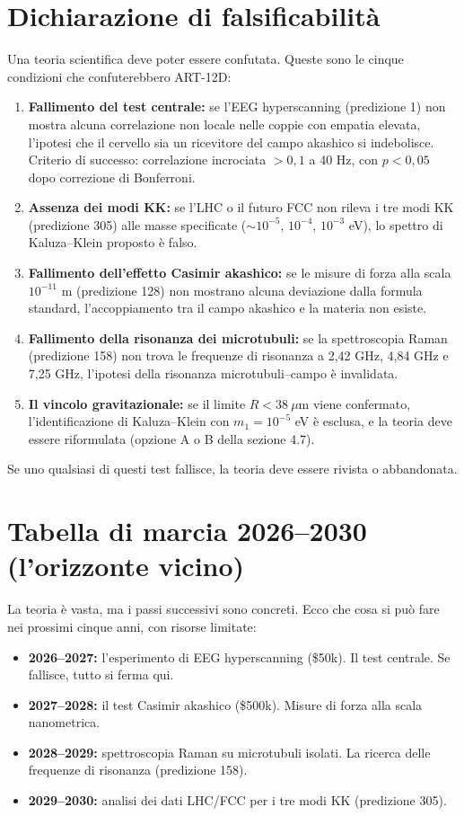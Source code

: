 \section{Dichiarazione di falsificabilità}
Una teoria scientifica deve poter essere confutata. Queste sono le cinque condizioni che confuterebbero ART-12D:
\begin{enumerate}
    \item \textbf{Fallimento del test centrale:} se l'EEG hyperscanning (predizione 1) non mostra alcuna correlazione non locale nelle coppie con empatia elevata, l'ipotesi che il cervello sia un ricevitore del campo akashico si indebolisce. Criterio di successo: correlazione incrociata $> 0,1$ a 40 Hz, con $p < 0,05$ dopo correzione di Bonferroni.
    \item \textbf{Assenza dei modi KK:} se l'LHC o il futuro FCC non rileva i tre modi KK (predizione 305) alle masse specificate ($\sim 10^{-5}$, $10^{-4}$, $10^{-3}$ eV), lo spettro di Kaluza--Klein proposto è falso.
    \item \textbf{Fallimento dell'effetto Casimir akashico:} se le misure di forza alla scala $10^{-11}$ m (predizione 128) non mostrano alcuna deviazione dalla formula standard, l'accoppiamento tra il campo akashico e la materia non esiste.
    \item \textbf{Fallimento della risonanza dei microtubuli:} se la spettroscopia Raman (predizione 158) non trova le frequenze di risonanza a 2,42 GHz, 4,84 GHz e 7,25 GHz, l'ipotesi della risonanza microtubuli--campo è invalidata.
    \item \textbf{Il vincolo gravitazionale:} se il limite $R < 38\ \mu$m viene confermato, l'identificazione di Kaluza--Klein con $m_1 = 10^{-5}$ eV è esclusa, e la teoria deve essere riformulata (opzione A o B della sezione 4.7).
\end{enumerate}
Se uno qualsiasi di questi test fallisce, la teoria deve essere rivista o abbandonata.

\section{Tabella di marcia 2026--2030 (l'orizzonte vicino)}
La teoria è vasta, ma i passi successivi sono concreti. Ecco che cosa si può fare nei prossimi cinque anni, con risorse limitate:
\begin{itemize}
    \item \textbf{2026--2027:} l'esperimento di EEG hyperscanning (\$50k). Il test centrale. Se fallisce, tutto si ferma qui.
    \item \textbf{2027--2028:} il test Casimir akashico (\$500k). Misure di forza alla scala nanometrica.
    \item \textbf{2028--2029:} spettroscopia Raman su microtubuli isolati. La ricerca delle frequenze di risonanza (predizione 158).
    \item \textbf{2029--2030:} analisi dei dati LHC/FCC per i tre modi KK (predizione 305).
\end{itemize}

\newpage
